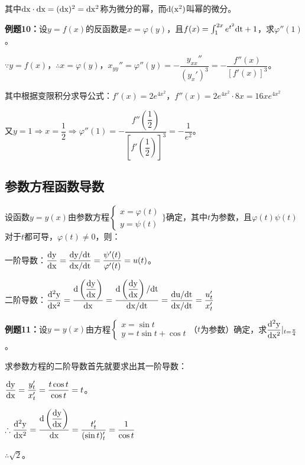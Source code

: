 \documentclass[UTF8, 12pt]{ctexart}
\begin{document}
其中$\rm{d}x\cdot\rm{d}x=(\rm{d}x)^2=\rm{d}x^2$称为微分的幂，而$\rm{d}(x^2)$叫幂的微分。

\textbf{例题10：}设$y=f(x)$的反函数是$x=\varphi(y)$，且$f(x)=\int_1^{2x}e^{t^2}\rm{d}t+1$，求$\varphi''(1)$。

$\because y=f(x)$，$\therefore x=\varphi(y)$，$x_{yy}''=\varphi''(y)=-\dfrac{y_{xx}''}{(y_x')^3}=-\dfrac{f''(x)}{[f'(x)]^3}$。

其中根据变限积分求导公式：$f'(x)=2e^{4x^2}$，$f''(x)=2e^{4x^2}\cdot 8x=16xe^{4x^2}$

又$y=1\Rightarrow x=\dfrac{1}{2}\Rightarrow\varphi''(1)=-\dfrac{f''\left(\dfrac{1}{2}\right)}{\left[f'\left(\dfrac{1}{2}\right)\right]^3}=-\dfrac{1}{e^2}$。

\subsection{参数方程函数导数}

设函数$y=y(x)$由参数方程$\left\{
    \begin{array}{l}
        x=\varphi(t) \\
        y=\psi(t)
    \end{array}
\}\right.$确定，其中$t$为参数，且$\varphi(t)\psi(t)$对于$t$都可导，$\varphi(t)\neq 0$，则：

\bigskip

一阶导数：$\dfrac{\rm{d}y}{\rm{d}x}=\dfrac{\rm{d}y/\rm{d}t}{\rm{d}x/\rm{d}t}=\dfrac{\psi'(t)}{\varphi'(t)}=u(t)$。

二阶导数：$\dfrac{\rm{d}^2y}{\rm{d}x^2}=\dfrac{\rm{d}\left(\dfrac{\rm{d}y}{\rm{d}x}\right)}{\rm{d}x}=\dfrac{\rm{d}\left(\dfrac{\rm{d}y}{\rm{d}x}\right)/\rm{d}t}{\rm{d}x/\rm{d}t}=\dfrac{\rm{d}u/\rm{d}t}{\rm{d}x/\rm{d}t}=\dfrac{u'_t}{x'_t}$

\textbf{例题11：}设$y=y(x)$由方程$\left\{
\begin{array}{l}
    x=\sin t \\
    y=t\sin t+\cos t
\end{array}
\right.
$（$t$为参数）确定，求$\dfrac{\rm{d}^2y}{\rm{d}x^2}\vert_{t=\frac{\pi}{4}}$。

求参数方程的二阶导数首先就要求出其一阶导数：

$\dfrac{\rm{d}y}{\rm{d}x}=\dfrac{y_t'}{x_t'}=\dfrac{t\cos t}{\cos t}=t$。

$\therefore\dfrac{\rm{d}^2y}{\rm{d}x^2}=\dfrac{\rm{d}\left(\dfrac{\rm{d}y}{\rm{d}x}\right)}{\rm{d}x}=\dfrac{t_t'}{(\sin t)_t'}=\dfrac{1}{\cos t}$

$\therefore \sqrt{2}$。
\end{document}
